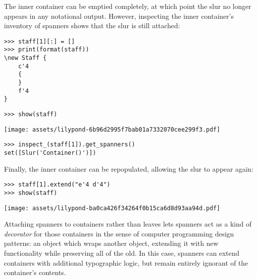 \noindent The inner container can be emptied completely, at which point the
slur no longer appears in any notational output. However, inspecting the inner
container's inventory of spanners shows that the slur is still attached:

\begin{comment}
<abjad>
staff[1][:] = []
print(format(staff))
show(staff)
inspect_(staff[1]).get_spanners()
</abjad>
\end{comment}

\begin{abjadbookoutput}
\begin{singlespacing}
\vspace{-0.5\baselineskip}
\begin{verbatim}
>>> staff[1][:] = []
>>> print(format(staff))
\new Staff {
    c'4
    {
    }
    f'4
}
\end{verbatim}
\begin{verbatim}
>>> show(staff)
\end{verbatim}
\noindent\texttt{[image: assets/lilypond-6b96d2995f7bab01a7332070cee299f3.pdf]}
\begin{verbatim}
>>> inspect_(staff[1]).get_spanners()
set([Slur('Container()')])
\end{verbatim}
\end{singlespacing}
\end{abjadbookoutput}

\noindent Finally, the inner container can be repopulated, allowing the slur to
appear again:

\begin{comment}
<abjad>
staff[1].extend("e'4 d'4")
show(staff)
</abjad>
\end{comment}

\begin{abjadbookoutput}
\begin{singlespacing}
\vspace{-0.5\baselineskip}
\begin{verbatim}
>>> staff[1].extend("e'4 d'4")
>>> show(staff)
\end{verbatim}
\noindent\texttt{[image: assets/lilypond-ba0ca426f34264f0b15ca6d8d93aa94d.pdf]}
\end{singlespacing}
\end{abjadbookoutput}

\noindent Attaching spanners to containers rather than leaves lets spanners act
as a kind of \emph{decorator}\cite{gamma1994design} for those containers in the
sense of computer programming design patterns: an object which wraps another
object, extending it with new functionality while preserving all of the old. In
this case, spanners can extend containers with additional typographic logic,
but remain entirely ignorant of the container's contents.


